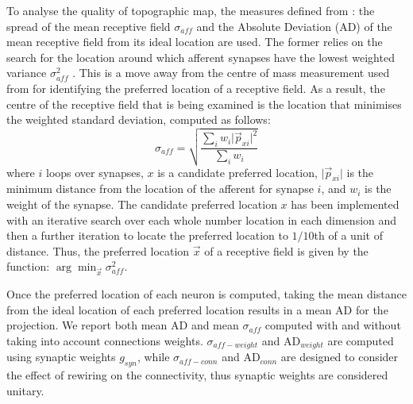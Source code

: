 \documentclass[letterpaper, 10 pt, conference]{ieeeconf}  %
\begin{document}


To analyse the quality of topographic map, the measures defined from \cite{bamford2010synaptic}: the spread of the mean receptive field $\sigma_{aff}$ and the Absolute Deviation (AD) of the mean receptive field from its ideal location are used.   
The former relies on the search for the location around which afferent synapses have the lowest weighted variance $\sigma^2_{aff}$ . 
This is a move away from the centre of mass measurement used from \cite{Elliott1999} for identifying the preferred location of a receptive field. As a result, the centre of the receptive field that is being examined is the location that minimises the weighted standard deviation, computed as follows:
%
\begin{equation}
    \sigma_{aff} = \sqrt{\frac{\sum_i{w_i\lvert{\vec{p}_{xi}}\rvert^2}}{\sum_i{w_i}}}
\end{equation}
%
where $i$ loops over synapses, $x$ is a candidate preferred location, $\lvert{\vec{p}_{xi}}\rvert$ is the minimum distance from the location of the afferent for synapse $i$, and $w_i$ is the weight of the synapse.
The candidate preferred location $x$ has been implemented with an iterative search over each whole number location in each dimension and then a further iteration to locate the preferred location to $1/10$th of a unit of distance. Thus, the preferred location $\vec{x}$ of a receptive field is given by the function: $\arg\min_{\vec{x}}{\sigma^2_{aff}}$.

Once the preferred location of each neuron is computed, taking the mean distance from the ideal location of each preferred location results in a mean AD for the projection. 
We report both mean AD and mean $\sigma_{aff}$ computed with and without taking into account connections weights. 
$\sigma_{aff-weight}$ and AD$_{weight}$ are computed using synaptic weights $g_{syn}$, 
while $\sigma_{aff-conn}$ and AD$_{conn}$ are designed to consider the effect of rewiring on the connectivity, thus synaptic weights are considered unitary.

\end{document}
